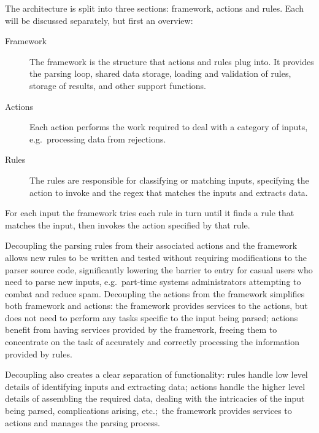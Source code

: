 \documentclass{svmult}
\begin{document}
\label{Architecture}

The architecture is split into three sections: framework, actions and
rules.  Each will be discussed separately, but first an overview:

\begin{description}

    \item [Framework]  The framework is the structure that actions and
        rules plug into.  It provides the parsing loop, shared data
        storage, loading and validation of rules, storage of results, and
        other support functions.

    \item [Actions]  Each action performs the work required to deal with a
        category of inputs, e.g.\ processing data from rejections.

    \item [Rules]  The rules are responsible for classifying or matching
        inputs, specifying the action to invoke and the regex that matches
        the inputs and extracts data.

\end{description}

For each input the framework tries each rule in turn until it finds a rule
that matches the input, then invokes the action specified by that rule.

Decoupling the parsing rules from their associated actions and the
framework allows new rules to be written and tested without requiring
modifications to the parser source code, significantly lowering the barrier
to entry for casual users who need to parse new inputs, e.g.\ part-time
systems administrators attempting to combat and reduce spam.  Decoupling
the actions from the framework simplifies both framework and actions: the
framework provides services to the actions, but does not need to perform
any tasks specific to the input being parsed; actions benefit from having
services provided by the framework, freeing them to concentrate on the task
of accurately and correctly processing the information provided by rules.

Decoupling also creates a clear separation of functionality: rules handle
low level details of identifying inputs and extracting data; actions handle
the higher level details of assembling the required data, dealing with the
intricacies of the input being parsed, complications arising, etc.;\ the
framework provides services to actions and manages the parsing process.
\end{document}
